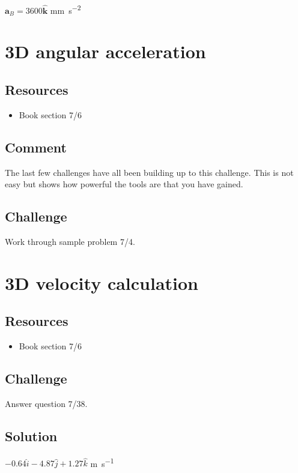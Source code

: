 $\bm{a}_B = 3600 \bm{\hat{k}}$ \si{\mm\per\square\second}




\newpage
\section{3D angular acceleration}

\subsection*{Resources}
\begin{itemize}
    \item Book section 7/6
\end{itemize}

\subsection*{Comment}
The last few challenges have all been building up to this challenge. This is not easy but shows how powerful the tools are that you have gained.

\subsection*{Challenge}
Work through sample problem 7/4.




\newpage
\section{3D velocity calculation}

\subsection*{Resources}
\begin{itemize}
    \item Book section 7/6
\end{itemize}

\subsection*{Challenge}
Answer question 7/38.

\subsection*{Solution}
$-0.64 \hat{i} - 4.87 \hat{j} + 1.27 \hat{k}$ \si{\meter\per\second}



